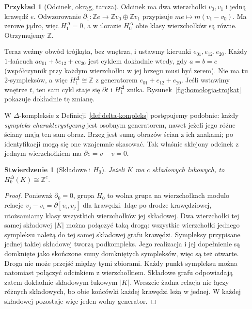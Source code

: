 \documentclass[11pt,a4paper,oneside]{report}
\newcommand{\Z}{\mathbb{Z}}
\theoremstyle{plain}
\newtheorem{stwierdzenie}[twierdzenie]{Stwierdzenie}
\theoremstyle{definition}
\newtheorem{przyklad}[twierdzenie]{Przykład}
\theoremstyle{remark}
\begin{document}
\begin{przyklad}[Odcinek, okrąg, tarcza]
\label{prz:homologia-odcinek-okrag}
Odcinek ma dwa wierzchołki $v_0,v_1$
i jedną krawędź $e$. Odwzorowanie
$\partial_1:\Z e\to\Z v_0\oplus\Z v_1$
przypisuje $me\mapsto m(v_1-v_0)$.
Ma zerowe jądro, więc $H_1^\Delta=0$,
a w ilorazie $H_0^\Delta$ obie klasy
wierzchołków są równe. Otrzymujemy $\Z$.

Teraz weźmy obwód trójkąta, bez wnętrza,
i ustawmy kierunki $e_{01},e_{12},e_{20}$.
Każdy $1$-łańcuch
$ae_{01}+be_{12}+ce_{20}$ jest cyklem
dokładnie wtedy, gdy $a=b=c$
(współczynnik przy każdym wierzchołku
w jej brzegu musi być zerem).
Nie ma tu $2$-sympleksów, a więc
$H_1^\Delta\cong\Z$ z generatorem
$e_{01}+e_{12}+e_{20}$.
Jeśli wstawimy wnętrze $t$, ten sam
cykl staje się $\partial t$ i
$H_1^\Delta$ znika. Rysunek~\ref{fig:homologia-trojkat}
pokazuje dokładnie tę zmianę.
\end{przyklad}

W $\Delta$-kompleksie z
Definicji~\ref{def:delta-kompleks} postępujemy
podobnie: każdy \emph{sympleks charakterystyczny}
jest osobnym generatorem, nawet jeżeli jego
różne ściany mają ten sam obraz. Brzeg
jest sumą obrazów ścian z ich znakami;
po identyfikacji mogą się one wzajemnie
skasować. Tak właśnie sklejony odcinek
z jednym wierzchołkiem ma $\partial e=v-v=0$.

\begin{stwierdzenie}[Składowe i $H_0$]
\label{prop:h0-symplicjalne}
Jeżeli $K$ ma $c$ składowych łukowych,
to $H_0^\Delta(K)\cong\Z^c$.
\end{stwierdzenie}
\begin{proof}
Ponieważ $\partial_0=0$, grupa $H_0$
to wolna grupa na wierzchołkach
modulo relacje
$v_j-v_i=\partial[v_i,v_j]$
dla krawędzi. Idąc po drodze krawędziowej,
utożsamiamy klasy wszystkich wierzchołków
jej składowej. Dwa wierzchołki tej samej
składowej $|K|$ można połączyć taką drogą:
wszystkie wierzchołki jednego sympleksu należą do tej samej
składowej grafu krawędzi. Sympleksy przypisane jednej takiej
składowej tworzą podkompleks. Jego realizacja i jej dopełnienie
są domknięte jako skończone sumy domkniętych sympleksów,
więc są też otwarte. Droga nie może przejść między tymi zbiorami.
Każdy punkt sympleksu można natomiast połączyć odcinkiem z wierzchołkiem.
Składowe grafu odpowiadają zatem dokładnie składowym łukowym $|K|$. Wreszcie żadna
relacja nie łączy różnych składowych,
bo obie końcówki każdej krawędzi leżą
w jednej. W każdej składowej pozostaje
więc jeden wolny generator.
\end{proof}
\end{document}
